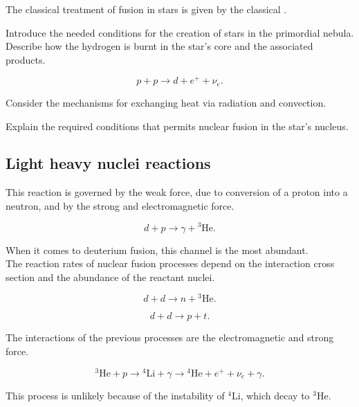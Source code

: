 \documentclass[openany]{book}
\begin{document}
The classical treatment of fusion in stars is given by the classical \cite{burbidge_burbidge_fowler_hoyle_1957}.

Introduce the needed conditions for the creation of stars in the primordial nebula.
Describe how the hydrogen is burnt in the star's core and the associated products. 

\begin{equation}
	p + p \rightarrow d + e^{+} + \nu_e.
\end{equation}

Consider the mechanisms for exchanging heat via radiation and convection.

Explain the required conditions that permits nuclear fusion in the star's nucleus.

\subsection{Light heavy nuclei reactions}

This reaction is governed by the weak force, due to conversion of a proton into a neutron, and by the strong and electromagnetic force.

\begin{equation}
	d + p \rightarrow \gamma + {}^{3}\mathrm{He}.
\end{equation}

When it comes to deuterium fusion, this channel is the most abundant.\\

The reaction rates of nuclear fusion processes depend on the interaction cross section and the abundance of the reactant nuclei.

\begin{equation}
	d + d \rightarrow n +  {}^{3}\mathrm{He}.
\end{equation}

\begin{equation}
	d + d \rightarrow p + t.
\end{equation}

The interactions of the previous processes are the electromagnetic and strong force.

\begin{equation}
	{}^{3}\mathrm{He} + p \rightarrow {}^{4}\mathrm{Li} + \gamma \rightarrow {}^{4}\mathrm{He} + e^{+} +  \nu_e + \gamma.
\end{equation}

This process is unlikely because of the instability of  ${}^{4}\mathrm{Li}$, which decay to ${}^{3}\mathrm{He}$.
\end{document}
